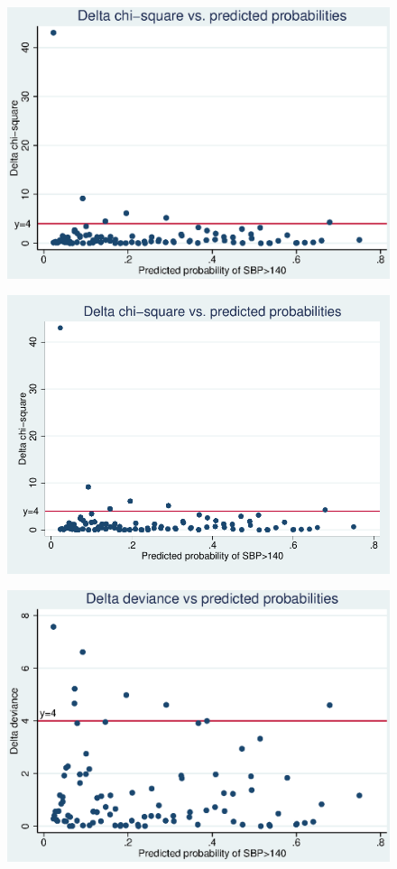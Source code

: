 \documentclass{article}
\begin{document}
\begin{enumerate}
\begin{figure}
\end{figure}
\begin{figure}
\includegraphics[width=.7\linewidth]{part4_Deltachisq_p_.eps}
\end{figure}
\begin{figure}
\includegraphics[width=.7\linewidth]{part4_Deltachisq_p_-eps-converted-to.pdf}
\end{figure}
\begin{figure}
\includegraphics[width=.7\linewidth]{part4_Deltadevi_p_.eps}
\end{figure}



\end{enumerate}
\end{document}
